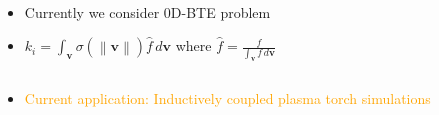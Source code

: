 \documentclass[mathserif, aspectratio=169]{beamer}
\newcommand{\vect}[1]{\boldsymbol{#1}}
\newcommand{\diff}[1]{\, d#1}
\newcommand{\norm}[1]{\left\lVert#1\right\rVert}
\begin{document}
\begin{frame}
\begin{columns}
\begin{column}{0.48\textwidth}
\begin{align*}
			\end{align*}
			\begin{itemize}
				\item Currently we consider 0D-BTE problem
				\item $k_i = \int_{\vect{v}} \sigma(\norm{\vect{v}}) \hat{f} \diff{\vect{v}}$ where $\hat{f} = \frac{f}{\int_{\vect{v}} f \diff{\vect{v}}}$
			\end{itemize}
		\end{column}
	\end{columns}
\begin{itemize}
	\item \textcolor{orange}{Current application: Inductively coupled plasma torch simulations} 
\end{itemize}
\end{frame}
\end{document}
